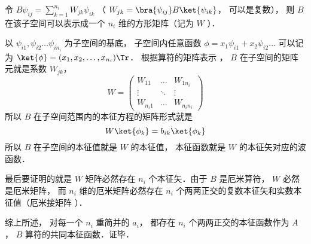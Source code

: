 令 $B \psi_{ij} = \sum_{k=1}^{n_i} W_{jk}\psi_{ik}$ （ $W_{jk} = \bra{\psi_{ij}} B \ket{\psi_{ik}}$， 可以是复数）， 则 $B$ 在该子空间可以表示成一个 $n_i$ 维的方形矩阵（记为 $W$ ）．

以 $\psi_{i1}, \psi_{i2} \dots \psi_{i n_i}$ 为子空间的基底， 子空间内任意函数 $\phi  = x_1 \psi_{i1} + x_2 \psi_{i2}\dots$ 可以记为 $\ket{\phi} = (x_1, x_2, \dots, x_{n_i})\Tr$． 根据算符的矩阵表示
， $B$ 在子空间的矩阵元就是系数 $W_{jk}$， 
\begin{equation}
W = \begin{pmatrix}
W_{11} & \ldots & W_{1 n_i}\\
\vdots & \ddots & \vdots \\
W_{n_i 1} & \ldots & W_{n_i n_i}
\end{pmatrix}
\end{equation}
所以 $B$ 在子空间范围内的本征方程的矩阵形式就是
\begin{equation}
W \ket{\phi_k} = b_{ik} \ket{\phi_k}
\end{equation}
所以 $B$ 在子空间的本征值就是 $W$ 的本征值， 本征函数就是 $W$ 的本征矢对应的波函数．

最后要证明的就是 $W$ 矩阵必然存在 $n_i$ 个本征矢．由于 $B$ 是厄米算符，  $W$ 必然是厄米矩阵， 而 $n_i$ 维的厄米矩阵必然存在 $n_i$ 个两两正交的复数本征矢和实数本征值（厄米接矩阵%
）．

综上所述， 对每一个 $n_i$ 重简并的 $a_i$，  都存在 $n_i$ 个两两正交的本征函数作为 $A$，  $B$ 算符的共同本征函数．证毕．
